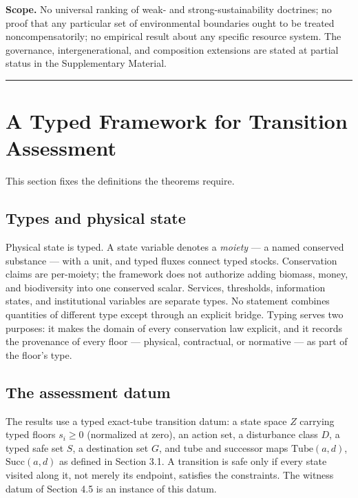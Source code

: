 \documentclass[3p,11pt]{elsarticle}
\begin{document}
\textbf{Scope.} No universal ranking of weak- and strong-sustainability doctrines; no proof that any particular set of environmental boundaries ought to be treated noncompensatorily; no empirical result about any specific resource system. The governance, intergenerational, and composition extensions are stated at partial status in the Supplementary Material.

\begin{center}\rule{0.5\linewidth}{0.5pt}\end{center}

\section{A Typed Framework for Transition
Assessment}\label{a-typed-framework-for-transition-assessment}

This section fixes the definitions the theorems require.

\subsection{Types and physical
state}\label{types-and-physical-state}

Physical state is typed. A state variable denotes a \emph{moiety} --- a
named conserved substance --- with a unit, and typed fluxes connect
typed stocks. Conservation claims are per-moiety; the framework does not
authorize adding biomass, money, and biodiversity into one conserved
scalar. Services, thresholds, information states, and institutional
variables are separate types. No statement combines quantities of different type except through an explicit bridge. Typing serves two purposes: it makes the domain of every
conservation law explicit, and it records the provenance of every floor
--- physical, contractual, or normative --- as part of the floor's type.

\subsection{The assessment datum}\label{the-assessment-datum}

The results use a typed exact-tube transition datum: a state space \(Z\) carrying typed floors \(s_i \ge 0\) (normalized at zero), an action set, a disturbance class \(D\), a typed safe set \(S\), a destination set \(G\), and tube and successor maps \(\mathrm{Tube}(a,d)\), \(\mathrm{Succ}(a,d)\) as defined in Section 3.1. A transition is safe only if every state visited along it, not merely its endpoint, satisfies the constraints. The witness datum of Section 4.5 is an instance of this datum.
\end{document}
